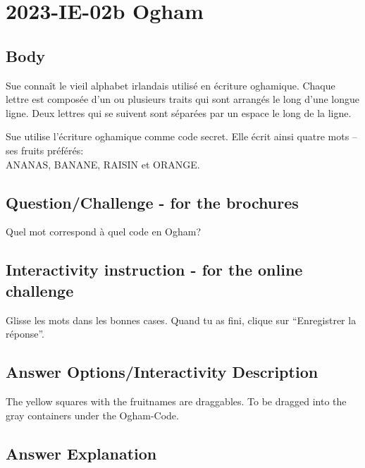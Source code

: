 \documentclass[a4paper,11pt]{report}
\newcommand{\taskGraphicsFolder}{..}
\begin{document}
\section*{\centering{} 2023-IE-02b Ogham}


\subsection*{Body}

Sue connaît le vieil alphabet irlandais utilisé en écriture oghamique.
Chaque lettre est composée d’un ou plusieurs traits qui sont arrangés le long d’une longue ligne. Deux lettres qui se suivent sont séparées par un espace le long de la ligne.

Sue utilise l’écriture oghamique comme code secret. Elle écrit ainsi quatre mots – ses fruits préférés: \\
ANANAS, BANANE, RAISIN et ORANGE.

{\em


\subsection*{Question/Challenge - for the brochures}

Quel mot correspond à quel code en Ogham?

{\centering%
\par}

}


\subsection*{Interactivity instruction - for the online challenge}

Glisse les mots dans les bonnes cases. Quand tu as fini, clique sur “Enregistrer la réponse”.

\begingroup
\renewcommand{\arraystretch}{1.5}
\subsection*{Answer Options/Interactivity Description}

The yellow squares with the fruitnames are draggables. To be dragged into the gray containers under the Ogham-Code.

\endgroup

\subsection*{Answer Explanation}
\end{document}

